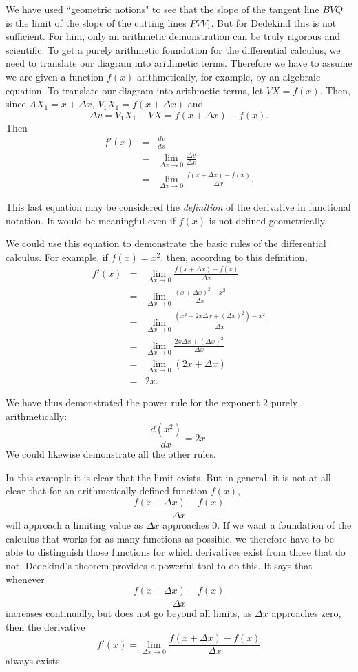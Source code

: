 \documentclass[twoside,openright]{article}
\newlength{\oldjot}
\begin{document}
We have used ``geometric notions" to see that the slope of the tangent
line $BVQ$ is the limit of the slope of the cutting lines $PVV_1$.
But for Dedekind this is not sufficient.  For him, only an arithmetic
demonstration can be truly rigorous and scientific. To get a purely
arithmetic foundation for the differential calculus, we need to
translate our diagram into arithmetic terms.  Therefore we have to
assume we are given a function $f(x)$ arithmetically, for example, by
an algebraic equation.  To translate our diagram into arithmetic
terms, let $VX=f(x)$.  Then, since $AX_1=x + \Delta x$,
$V_1X_1 = f(x+\Delta x)$ and
$$\Delta v = V_1X_1 - VX = f(x+\Delta x) - f(x).$$
Then
\setlength{\jot}{1.5ex}
\begin{eqnarray*}
  f'(x) & = & \frac{dv}{dx}\\
        & = & \lim_{\Delta x \rightarrow 0}\frac{\Delta v}{\Delta x}\\
        & = &  \lim_{\Delta x \rightarrow 0}\frac{f(x+\Delta x) - f(x)}{\Delta x}.
\end{eqnarray*}
\setlength{\jot}{\oldjot}

\noindent
This last equation may be considered the {\em definition} of the
derivative in functional notation.  It would be meaningful even if
$f(x)$ is not defined geometrically.

We could use this equation to demonstrate the basic rules of the
differential calculus.  For example, if $f(x) = x^2$, then, according
to this definition,
\setlength{\jot}{1.5ex}
\begin{eqnarray*}
  f'(x) & = &  \lim_{\Delta x \rightarrow 0}\frac{f(x+\Delta x) - f(x)}{\Delta x} \\
        & = & \lim_{\Delta x \rightarrow 0} \frac{(x+\Delta x)^2 - x^2}{\Delta x}\\
        & = &  \lim_{\Delta x \rightarrow 0} \frac{(x^2 + 2x\Delta x + (\Delta x)^2) - x^2}{\Delta x}\\
        & = &  \lim_{\Delta x \rightarrow 0} \frac{2x\Delta x + (\Delta x)^2}{\Delta x}\\
        & = &  \lim_{\Delta x \rightarrow 0} (2x + \Delta x)\\
        & = & 2x.
\end{eqnarray*}
\setlength{\jot}{\oldjot}

\noindent We have thus demonstrated the power rule for the exponent 2
purely arithmetically:
$$\frac{d(x^2)}{dx}= 2x.$$
We could likewise demonstrate all the other rules.

In this example it is clear that the limit exists.  But in general, it
is not at all clear that for an arithmetically defined function
$f(x)$,
$$\frac{f(x+\Delta x) - f(x)}{\Delta x}$$
will approach a limiting value as $\Delta x$ approaches 0.  If we want
a foundation of the calculus that works for as many functions as
possible, we therefore have to be able to distinguish those functions
for which derivatives exist from those that do not.  Dedekind's
theorem provides a powerful tool to do this.  It says that whenever
$$\frac{f(x+\Delta x) - f(x)}{\Delta x}$$
increases continually, but does not go beyond all limits, as
$\Delta x$ approaches zero, then the derivative
$$f'(x) = \lim_{\Delta x \rightarrow 0} \frac{f(x+\Delta x) - f(x)}{\Delta x}$$
always exists. 
\end{document}

